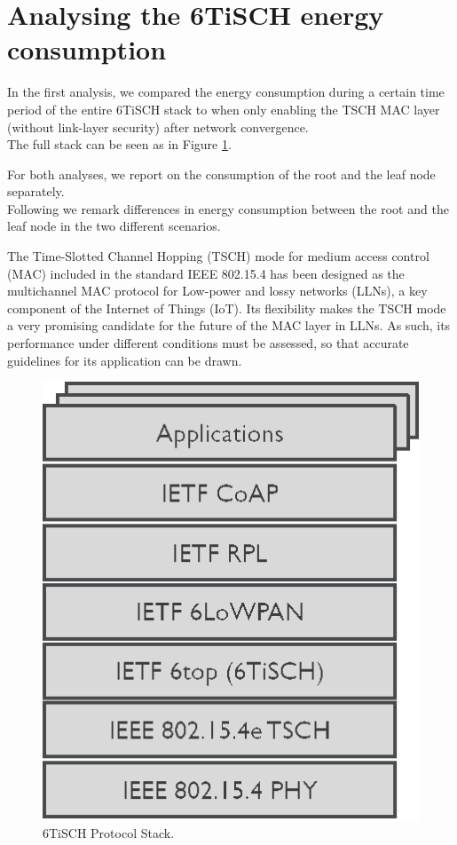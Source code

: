 \documentclass[conference]{IEEEtran}
\begin{document}
\section{Analysing the 6TiSCH energy consumption}
\label{section:task1}
In the first analysis, we compared the energy consumption during a certain time period of the entire 6TiSCH stack to when only enabling the TSCH MAC layer (without link-layer security) after network convergence.\\
The full stack can be seen as in Figure \ref{fig:6tischStack}.


For both analyses, we report on the consumption of the root and the leaf node separately.\\
Following we remark differences in energy consumption between the root and the leaf node in the two different scenarios.

The Time-Slotted Channel Hopping (TSCH) mode for medium access control (MAC) included in the standard IEEE 802.15.4 has been designed as the multichannel MAC protocol for Low-power and lossy networks (LLNs), a key component of the Internet of Things (IoT). Its ﬂexibility makes the TSCH mode a very promising candidate for the future of the MAC layer in LLNs. As such, its performance under different conditions must be assessed, so that accurate guidelines for its application can be drawn\cite{TSCHExperimentEval}.
\begin{figure}[]
	\centering
	\includegraphics[width=.25\textwidth,keepaspectratio]{6TiSCH-Protocol-Stack.png}
	\caption{6TiSCH Protocol Stack\cite{TimeCritical6tisch}.}
	\label{fig:6tischStack}
\end{figure}
\end{document}
